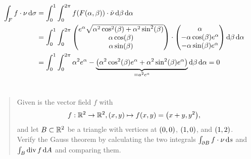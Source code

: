 \documentclass{exercise}
\begin{document}
\begin{enumerate}
		\begin{align*}
			\int_F f \cdot \nu\d\sigma &= \int_0^1 \int_0^{2\pi}f\parentheses*{F\parentheses*{\alpha, \beta}} \cdot \tilde{\nu}\d\beta\d\alpha\\
			&= \int_0^1 \int_0^{2\pi} \begin{pmatrix}
				e^\alpha \sqrt{\alpha^2 \cos^2\parentheses*{\beta} + \alpha^2 \sin^2\parentheses*{\beta}}\\
				\alpha\cos\parentheses*{\beta}\\
				\alpha\sin\parentheses*{\beta}
			\end{pmatrix} \cdot \begin{pmatrix}
				\alpha\\
				-\alpha\cos\parentheses*{\beta}e^\alpha\\
				-\alpha\sin\parentheses*{\beta}e^\alpha
			\end{pmatrix}\d\beta\d\alpha\\
			&= \int_0^1 \int_0^{2\pi} \alpha^2 e^\alpha - \underbrace{\parentheses*{\alpha^2 \cos^2\parentheses*{\beta}e^\alpha + \alpha^2 \sin^2\parentheses*{\beta}e^\alpha}}_{= a^2 e^a} \d\beta\d\alpha = 0
		\end{align*}
	\end{enumerate}


	\section{}

	\begin{quote}
		Given is the vector field \(f\) with
		\[
			f: \R^2 \to \R^2, \parentheses*{x, y} \mapsto f\parentheses*{x, y} = \parentheses*{x + y, y^2},
		\]
		and let \(B \subset \R^2\) be a triangle with vertices at \(\parentheses*{0, 0}\), \(\parentheses*{1, 0}\), and \(\parentheses*{1, 2}\).
		Verify the Gauss theorem by calculating the two integrals \(\int_{\partial B}f \cdot \nu\d s\) and \(\int_B \div f\d A\) and comparing them.
	\end{quote}
\end{document}
